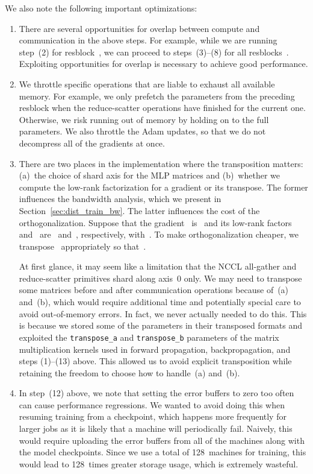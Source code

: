 \documentclass{article}
\begin{document}
We also note the following important optimizations:
\begin{enumerate}
    \item There are several opportunities for overlap between compute and communication in the above steps. For example, while we are running step~(2) for resblock~, we can proceed to steps~(3)--(8) for all resblocks~. Exploiting opportunities for overlap is necessary to achieve good performance.
    \item We throttle specific operations that are liable to exhaust all available memory. For example, we only prefetch the parameters from the preceding resblock when the reduce-scatter operations have finished for the current one. Otherwise, we risk running out of memory by holding on to the full parameters. We also throttle the Adam updates, so that we do not decompress all of the gradients at once.
    \item There are two places in the implementation where the transposition matters: (a)~the choice of shard axis for the MLP matrices and (b)~whether we compute the low-rank factorization for a gradient or its transpose. The former influences the bandwidth analysis, which we present in Section~\ref{sec:dist_train_bw}. The latter influences the cost of the orthogonalization. Suppose that the gradient~ is~ and its low-rank factors~ and~ are~ and~, respectively, with~. To make orthogonalization cheaper, we transpose~ appropriately so that~.
    
    At first glance, it may seem like a limitation that the NCCL all-gather and reduce-scatter primitives shard along axis~0 only. We may need to transpose some matrices before and after communication operations because of~(a) and~(b), which would require additional time and potentially special care to avoid out-of-memory errors. In fact, we never actually needed to do this. This is because we stored some of the parameters in their transposed formats and exploited the \texttt{transpose\_a} and \texttt{transpose\_b} parameters of the matrix multiplication kernels used in forward propagation, backpropagation, and steps (1)--(13) above. This allowed us to avoid explicit transposition while retaining the freedom to choose how to handle~(a) and~(b).
    \item In step~(12) above, we note that setting the error buffers to zero too often can cause performance regressions. We wanted to avoid doing this when resuming training from a checkpoint, which happens more frequently for larger jobs as it is likely that a machine will periodically fail. Naively, this would require uploading the error buffers from all of the machines along with the model checkpoints. Since we use a total of 128~machines for training, this would lead to 128~times greater storage usage, which is extremely wasteful.
    

\end{enumerate}
\end{document}
